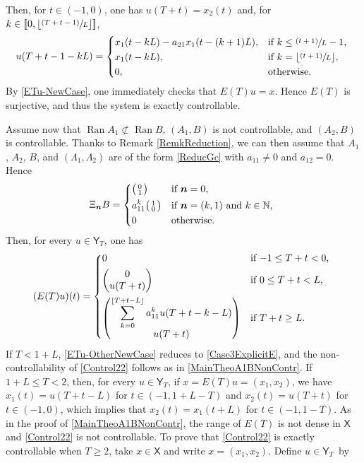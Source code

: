\documentclass[JEP,XML,SOM,Unicode]{cedram}
\newcommand{\psfrac}[2]{\sfrac{(#1)}{#2}}
\newcommand{\bn}{\boldsymbol{n}}
\newenvironment{smallpmatrix}{\big(\begin{smallmatrix}}{\end{smallmatrix}\big)}
\newcommand{\llbracket}{[\![}
\newcommand{\rrbracket}{]\!]}
\theoremstyle{plain}
\theoremstyle{definition}
\DeclareMathOperator{\range}{Ran}
\newcommand{\floor}[1]{\left\lfloor #1 \right\rfloor}
\begin{document}
Then, for $t \in (-1, 0)$, one has $u(T + t) = x_2(t)$ and, for $k \in \left\llbracket 0, \floor{\psfrac{T + t - 1}{L}}\right\rrbracket$,
\[
u(T + t - 1 - k L) =
\begin{dcases*}
x_1(t - k L) - a_{21} x_1(t - (k+1)L), & if $k \leq \psfrac{t+1}{L} - 1$, \\
x_1(t - k L), & if $k = \floor{\psfrac{t + 1}{L}}$, \\
0, & otherwise.
\end{dcases*}
\]
By \eqref{ETu-NewCase}, one immediately checks that $E(T) u = x$. Hence $E(T)$ is surjective, and thus the system is exactly controllable.

Assume now that $\range A_1 \not\subset \range B$, $(A_1, B)$ is not controllable, and $(A_2, B)$ is controllable. Thanks to Remark \ref{RemkReduction}, we can then assume that $A_1$, $A_2$, $B$, and $(\Lambda_1, \Lambda_2)$ are of the form \eqref{ReducGc} with $a_{11} \neq 0$ and $a_{12} = 0$. Hence
\[
\Xi_{\bn} B =
\begin{dcases*}
\begin{smallpmatrix}0 \\ 1 \\\end{smallpmatrix} & if $\bn = 0$, \\
a_{11}^k \begin{smallpmatrix}1 \\ 0 \\\end{smallpmatrix} & if $\bn = (k, 1)$ and $k \in \mathbb N$, \\
0 & otherwise.
\end{dcases*}
\]
Then, for every $u \in \mathsf Y_T$, one has
\begin{equation}
\label{ETu-OtherNewCase}
(E(T) u)(t) =
\begin{dcases*}
0 & if $-1 \leq T + t < 0$, \\
\begin{pmatrix}0 \\ u(T + t)\end{pmatrix} & if $0 \leq T + t < L$, \\
\begin{pmatrix} \displaystyle\sum_{k=0}^{\floor{T + t - L}} a_{11}^k u(T + t - k - L) \\ u(T + t)\end{pmatrix} & if $T + t \geq L$.
\end{dcases*}
\end{equation}
If $T < 1 + L$, \eqref{ETu-OtherNewCase} reduces to \eqref{Case3ExplicitE}, and the non-controllability of \eqref{Control22} follows as in \eqref{MainTheoA1BNonContr}. If $1 + L \leq T < 2$, then, for every $u \in \mathsf Y_T$, if $x = E(T) u = (x_1, x_2)$, we have $x_1(t) = u(T + t - L)$ for $t \in (-1, 1 + L - T)$ and $x_2(t) = u(T + t)$ for $t \in (-1, 0)$, which implies that $x_2(t) = x_1(t + L)$ for $t \in (-1, 1 - T)$. As in the proof of \eqref{MainTheoA1BNonContr}, the range of $E(T)$ is not dense in $\mathsf X$ and \eqref{Control22} is not controllable. To prove that \eqref{Control22} is exactly controllable when $T \geq 2$, take $x \in \mathsf X$ and write $x = (x_1, x_2)$. Define $u \in \mathsf Y_T$~by
\end{document}
